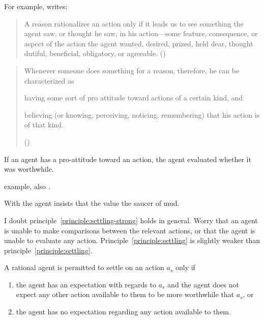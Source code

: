 \documentclass[10pt]{article}
\newcommand{\hozlinedash}[0]{%
  \noindent\hdashrule[0.5ex][c]{\textwidth}{.1pt}{2.5pt}
}
\begin{document}
\hozlinedash

For example, \citeauthor{Davidson:1963aa} writes:

\begin{quote}
  A reason rationalizes an action only if it leads us to see something the agent saw, or thought he saw, in his action---some feature, consequence, or aspect of the action the agent wanted, desired, prized, held dear, thought dutiful, beneficial, obligatory, or agreeable.\nolinebreak
  \mbox{}\hfill\mbox{(\citeyear[686]{Davidson:1963aa})}
\end{quote}

\begin{quote}
  Whenever someone does something for a reason, therefore, he can be characterized as
  \begin{enumerate*}[label=(\alph*), ref=(\alph*)]
  \item\label{davidson:a} having some sort of pro attitude toward actions of a certain kind, and
  \item\label{davidson:b} believing (or knowing, perceiving, noticing, remembering) that his action is of that kind.
  \end{enumerate*}
  \mbox{}\hfill\mbox{(\citeyear[686--686]{Davidson:1963aa})}
\end{quote}

If an agent has a pro-attitude toward an action, the agent evaluated whether it was worthwhile.


\citeauthor{Anscombe:1957aa} example, also \citeauthor{Quinn:1993aa}.

With \citeauthor{Anscombe:1957aa} the agent insists that the value the saucer of mud.

\hozlinedash

I doubt principle~\ref{principle:settling-strong} holds in general.
Worry that an agent is unable to make comparisons between the relevant actions, or that the agent is unable to evaluate any action.
Principle~\ref{principle:settling} is slightly weaker than principle~\ref{principle:settling}.

\begin{principle}[Settling]\label{principle:settling}
  A rational agent is permitted to settle on an action \(a_{s}\) only if
  \begin{enumerate}
  \item the agent has an expectation with regards to \(a_{s}\) and the agent does not expect any other action available to them to be more worthwhile that \(a_{s}\), or
  \item the agent has no expectation regarding any action available to them.
  \end{enumerate}
\end{principle}
\end{document}

